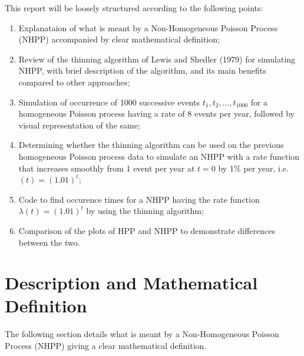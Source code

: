 \documentclass[%
 reprint,
 amsmath,amssymb,
 aps,
]{revtex4-2}
\theoremstyle{definition}
\begin{document}
This report will be loosely structured according to the following points:
\begin{enumerate}
\item Explanataion of what is meant by a Non-Homogeneous Poisson Process (NHPP) accompanied by clear mathematical definition;
\item Review of the thinning algorithm of Lewis and Shedler (1979) for simulating NHPP, with brief description of the algorithm, and its main benefits compared to other approaches;
\item Simulation of occurrence of 1000 successive events ${t_1, t_2, . . . , t_{1000}}$ for a homogeneous Poisson process having a rate of 8 events per year, followed by visual representation of the same;
\item Determining whether the thinning algorithm can be used on the previous homogeneous Poisson process data to simulate an NHPP with a rate function that increases smoothly from 1 event per year at $t = 0$ by 1\% per year, i.e. $(t) = (1.01)^t$;
\item Code to find occurence times for a NHPP having the rate function $\lambda(t) = (1.01)^t$ by using the thinning algorithm;
\item Comparison of the plots of HPP and NHPP to demonstrate differences between the two.

\end{enumerate}

\section{\label{q:1}Description and Mathematical Definition}
The following section details what is meant by a Non-Homogeneous Poisson Process (NHPP) giving a clear
mathematical definition.\\
\end{document}

